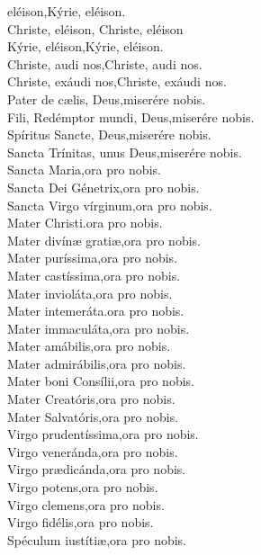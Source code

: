 eléison,\hfill Kýrie, eléison.\\
Christe, eléison, \hfill Christe, eléison\\
Kýrie, eléison,\hfill Kýrie, eléison.\\
Christe, audi nos,\hfill Christe, audi nos.\\
Christe, exáudi nos,\hfill Christe, exáudi nos.\\
Pater de c{\ae}lis, Deus,\hfill miserére nobis.\\
Fili, Redémptor mundi, Deus,\hfill miserére nobis.\\
Spíritus Sancte, Deus,\hfill miserére nobis.\\
Sancta Trínitas, unus Deus,\hfill miserére nobis.\\
Sancta Maria,\hfill ora pro nobis.\\
Sancta Dei Génetrix,\hfill ora pro nobis.\\
Sancta Virgo vírginum,\hfill ora pro nobis.\\
Mater Christi.\hfill ora pro nobis.\\
Mater divín{\ae} grati{\ae},\hfill ora pro nobis.\\
Mater puríssima,\hfill ora pro nobis.\\
Mater castíssima,\hfill ora pro nobis.\\
Mater invioláta,\hfill ora pro nobis.\\
Mater intemeráta.\hfill ora pro nobis.\\
Mater immaculáta,\hfill ora pro nobis.\\
Mater amábilis,\hfill ora pro nobis.\\
Mater admirábilis,\hfill ora pro nobis.\\
Mater boni Consílii,\hfill ora pro nobis.\\
Mater Creatóris,\hfill ora pro nobis.\\
Mater Salvatóris,\hfill ora pro nobis.\\
Virgo prudentíssima,\hfill ora pro nobis.\\
Virgo veneránda,\hfill ora pro nobis.\\
Virgo pr{\ae}dicánda,\hfill ora pro nobis.\\
Virgo potens,\hfill ora pro nobis.\\
Virgo clemens,\hfill ora pro nobis.\\
Virgo fidélis,\hfill ora pro nobis.\\
Spéculum iustíti{\ae},\hfill ora pro nobis.\\
